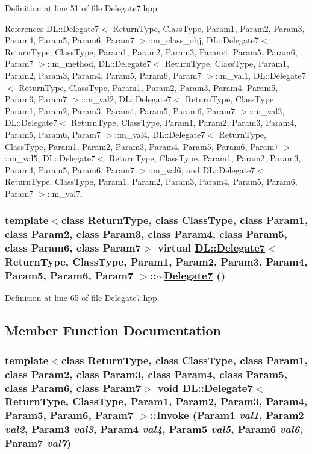 Definition at line 51 of file Delegate7.hpp.

References DL::Delegate7$<$ Return\-Type, Class\-Type, Param1, Param2, Param3, Param4, Param5, Param6, Param7 $>$::m\_\-class\_\-obj, DL::Delegate7$<$ Return\-Type, Class\-Type, Param1, Param2, Param3, Param4, Param5, Param6, Param7 $>$::m\_\-method, DL::Delegate7$<$ Return\-Type, Class\-Type, Param1, Param2, Param3, Param4, Param5, Param6, Param7 $>$::m\_\-val1, DL::Delegate7$<$ Return\-Type, Class\-Type, Param1, Param2, Param3, Param4, Param5, Param6, Param7 $>$::m\_\-val2, DL::Delegate7$<$ Return\-Type, Class\-Type, Param1, Param2, Param3, Param4, Param5, Param6, Param7 $>$::m\_\-val3, DL::Delegate7$<$ Return\-Type, Class\-Type, Param1, Param2, Param3, Param4, Param5, Param6, Param7 $>$::m\_\-val4, DL::Delegate7$<$ Return\-Type, Class\-Type, Param1, Param2, Param3, Param4, Param5, Param6, Param7 $>$::m\_\-val5, DL::Delegate7$<$ Return\-Type, Class\-Type, Param1, Param2, Param3, Param4, Param5, Param6, Param7 $>$::m\_\-val6, and DL::Delegate7$<$ Return\-Type, Class\-Type, Param1, Param2, Param3, Param4, Param5, Param6, Param7 $>$::m\_\-val7.\hypertarget{classDL_1_1Delegate7_a1}{
\subsubsection[$\sim$Delegate7]{\setlength{\rightskip}{0pt plus 5cm}template$<$class Return\-Type, class Class\-Type, class Param1, class Param2, class Param3, class Param4, class Param5, class Param6, class Param7$>$ virtual \hyperlink{classDL_1_1Delegate7}{DL::Delegate7}$<$ Return\-Type, Class\-Type, Param1, Param2, Param3, Param4, Param5, Param6, Param7 $>$::$\sim$\hyperlink{classDL_1_1Delegate7}{Delegate7} ()}}
\label{classDL_1_1Delegate7_a1}




Definition at line 65 of file Delegate7.hpp.

\subsection{Member Function Documentation}
\hypertarget{classDL_1_1Delegate7_a3}{
\subsubsection[Invoke]{\setlength{\rightskip}{0pt plus 5cm}template$<$class Return\-Type, class Class\-Type, class Param1, class Param2, class Param3, class Param4, class Param5, class Param6, class Param7$>$ void \hyperlink{classDL_1_1Delegate7}{DL::Delegate7}$<$ Return\-Type, Class\-Type, Param1, Param2, Param3, Param4, Param5, Param6, Param7 $>$::Invoke (Param1 {\em val1}, Param2 {\em val2}, Param3 {\em val3}, Param4 {\em val4}, Param5 {\em val5}, Param6 {\em val6}, Param7 {\em val7})}}
\label{classDL_1_1Delegate7_a3}




